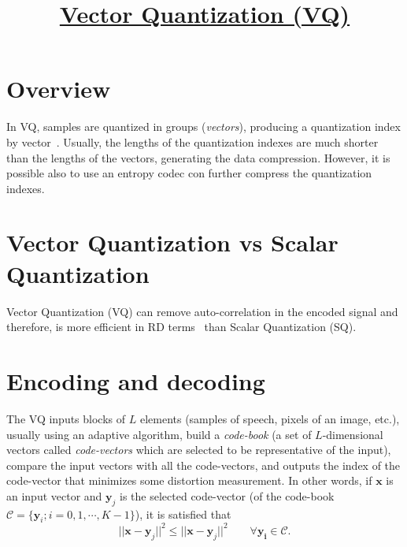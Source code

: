 
\title{\href{https://github.com/vicente-gonzalez-ruiz/vector_quantization}{Vector Quantization (VQ)}}

\maketitle
\tableofcontents

\section{Overview}

In VQ, samples are quantized in groups (\emph{vectors}), producing a
quantization index by vector~\cite{sayood2017introduction}.  Usually,
the lengths of the quantization indexes are much shorter than the
lengths of the vectors, generating the data compression. However, it
is possible also to use an entropy codec con further compress the
quantization indexes.

\section{Vector Quantization vs Scalar Quantization}

Vector Quantization (VQ) can remove auto-correlation in the encoded
signal and therefore, is more efficient in RD
terms~\cite{vruiz__information_theory} than Scalar Quantization (SQ).



\section{Encoding and decoding}

The VQ inputs blocks of $L$ elements (samples of speech, pixels of an
image, etc.), usually using an adaptive algorithm, build a
\emph{code-book} (a set of $L$-dimensional vectors called
\emph{code-vectors} which are selected to be representative of the
input), compare the input vectors with all the code-vectors, and
outputs the index of the code-vector that minimizes some distortion
measurement. In other words, if $\mathbf{x}$ is an input vector and
$\mathbf{y}_j$ is the selected code-vector (of the code-book
$\mathcal{C}=\{\mathbf{y}_i;i=0,1,\cdots,K-1\}$), it is satisfied that
\begin{equation}
  ||\mathbf{x}-\mathbf{y}_j||^2 \le || \mathbf{x}-\mathbf{y}_j||^2\qquad\forall\mathbf{y_i}\in\mathcal{C}.
\end{equation}

